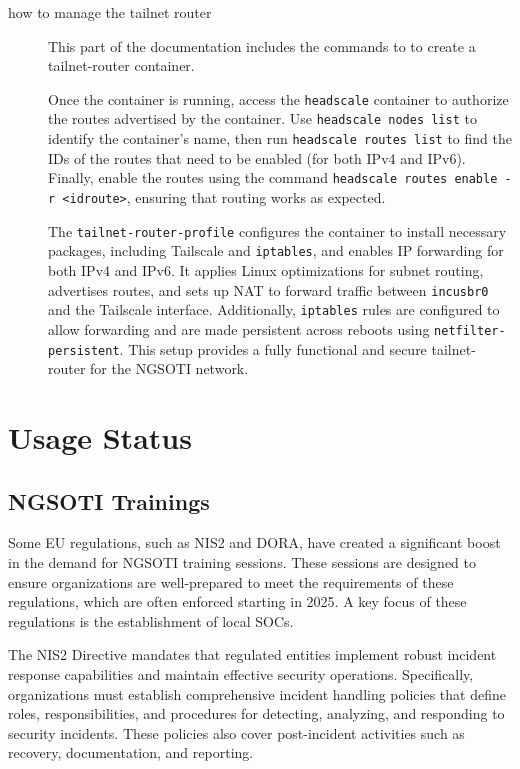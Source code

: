 \begin{description}
	\item [how to manage the tailnet router]
This part of the documentation includes the commands to to create a tailnet-router container.

Once the container is running, access the \texttt{headscale} container to authorize
the routes advertised by the container. Use \texttt{headscale nodes list} to identify
the container's name, then run \texttt{headscale routes list} to find the IDs of the
routes that need to be enabled (for both IPv4 and IPv6). Finally, enable the routes
using the command \texttt{headscale routes enable -r <idroute>}, ensuring that
routing works as expected.

The \texttt{tailnet-router-profile} configures the container to install necessary
packages, including Tailscale and \texttt{iptables}, and enables IP forwarding for
both IPv4 and IPv6. It applies Linux optimizations for subnet routing, advertises
routes, and sets up NAT to forward traffic between \texttt{incusbr0} and the Tailscale
interface. Additionally, \texttt{iptables} rules are configured to allow forwarding
and are made persistent across reboots using \texttt{netfilter-persistent}. This setup
provides a fully functional and secure tailnet-router for the NGSOTI network.

\end{description}

\chapter{Usage Status}

\section{NGSOTI Trainings}\label{training}
Some EU regulations, such as NIS2 and DORA, have created a significant boost in the demand for NGSOTI training sessions. These sessions are designed to ensure organizations are well-prepared to meet the requirements of these regulations, which are often enforced starting in 2025. A key focus of these regulations is the establishment of local SOCs.

The NIS2 Directive mandates that regulated entities implement robust incident response capabilities and maintain effective security operations. Specifically, organizations must establish comprehensive incident handling policies that define roles, responsibilities, and procedures for detecting, analyzing, and responding to security incidents. These policies also cover post-incident activities such as recovery, documentation, and reporting.

